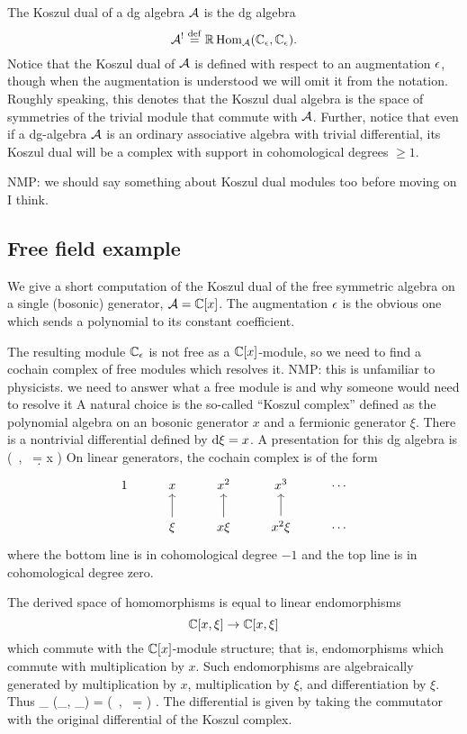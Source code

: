 \documentclass[11pt]{amsart}
\def\natalie#1{{\textcolor{green!65!black}{NMP: {#1}}}}
\begin{document}
The Koszul dual of a dg algebra $\mathcal A$ is the dg algebra
\[
\mathcal A^! \overset{\rm def}{=} \mathbb{R}\operatorname{Hom}_\mathcal A(\mathbb C_\epsilon,\mathbb C_\epsilon) .
\] 
Notice that the Koszul dual of $\mathcal A$ is defined with respect to an augmentation $\epsilon$, though when the augmentation is understood we will omit it from the notation. Roughly speaking, this denotes that the Koszul dual algebra is the space of symmetries of the trivial module that commute with $\mathcal A$. Further, notice that even if a dg-algebra $\mathcal A$ is an ordinary associative algebra with trivial differential, its Koszul dual will be a complex with support in cohomological degrees $\geq 1$. 

\natalie{we should say something about Koszul dual modules too before moving on I think.}

\subsection{Free field example} 

We give a short computation of the Koszul dual of the free symmetric algebra on a single (bosonic) generator, $\mathcal A = \mathbb C[x]$. 
The augmentation $\epsilon$ is the obvious one which sends a polynomial to its constant coefficient. 

The resulting module $\mathbb C_{\epsilon}$ is not free as a $\mathbb C[x]$-module, so we need to find a cochain complex of free modules which resolves it. \natalie{this is unfamiliar to physicists. we need to answer what a free module is and why someone would need to resolve it}
A natural choice is the so-called ``Koszul complex'' defined as the polynomial algebra on an bosonic generator $x$ and a fermionic generator $\xi$. 
There is a nontrivial differential defined by ${\rm d} \xi = x$. 
A presentation for this dg algebra is 
\beqn\label{eqn:res1}
\bigg(\CC[x, \xi] \, , \, \d = x \frac{\partial}{\partial \xi} \bigg) 
\eeqn
On linear generators, the cochain complex is of the form
\[
\begin{tikzcd} 
1 & x & x^2 & x^3 & \cdots \\
& \xi \ar[u] & x \xi \ar[u] & x^2 \xi \ar[u] & \cdots 
\end{tikzcd}
\]
where the bottom line is in cohomological degree $-1$ and the top line is in cohomological degree zero. 

The derived space of homomorphisms is equal to linear endomorphisms 
\[
\mathbb C[x, \xi] \to \mathbb C[x,\xi]
\] 
which commute with the $\mathbb C[x]$-module structure; that is, endomorphisms which commute with multiplication by $x$. 
Such endomorphisms are algebraically generated by multiplication by $x$, multiplication by $\xi$, and differentiation by $\xi$. 
Thus 
\beqn\label{eqn:rhom1}
\RHom_{\CC[x]} \left(\CC_\ep, \CC_\ep\right) = \left(\CC{} \, , \, \d =  \right) .
\eeqn
The differential is given by taking the commutator with the original differential of the Koszul complex. 
\end{document}
